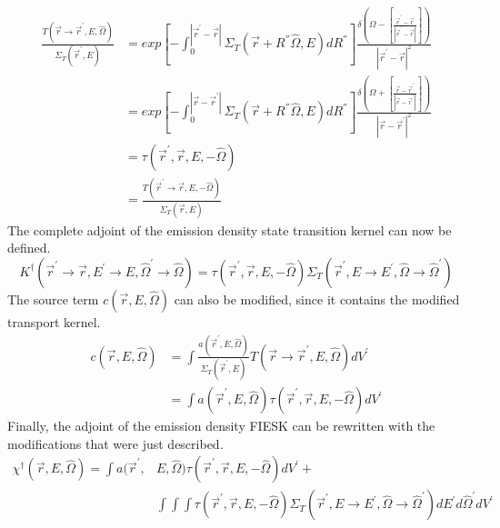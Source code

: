 \begin{align}
  \frac{T(\vec{r} \to \vec{r}^{'},E,\hat{\Omega})}{\Sigma_T(\vec{r}^{'},E)} & =
  exp\left[-\int_0^{|\vec{r}^{'} - \vec{r}|} 
    \Sigma_T \left(\vec{r} + R^{''}\hat{\Omega},E \right) dR^{''} 
    \right] \frac{\delta \left(\Omega - \left[\frac{\vec{r}^{'} - \vec{r}}
      {|\vec{r}^{'} - \vec{r}|}\right]\right)}
       {|\vec{r}^{'} - \vec{r}|^2} \nonumber \\
       & = exp\left[-\int_0^{|\vec{r} - \vec{r}^{'}|} 
    \Sigma_T \left(\vec{r} + R^{''}\hat{\Omega},E \right) dR^{''} 
    \right] \frac{\delta \left(\Omega + \left[\frac{\vec{r} - \vec{r}^{'}}
      {|\vec{r} - \vec{r}^{'}|}\right]\right)}
       {|\vec{r} - \vec{r}^{'}|^2} \nonumber \\
       & = \tau(\vec{r}^{'},\vec{r},E,-\hat{\Omega}) \\
       & = \frac{T(\vec{r}^{'} \to \vec{r},E,-\hat{\Omega})}
       {\Sigma_T(\vec{r},E)}
\end{align}
The complete adjoint of the emission density state transition kernel can now be 
defined.
\begin{equation}
  K^{\dagger}(\vec{r}^{'} \to \vec{r},E^{'} \to E,
  \hat{\Omega}^{'} \to \hat{\Omega}) = 
  \tau(\vec{r}^{'},\vec{r},E,-\hat{\Omega}) 
  \Sigma_T(\vec{r}^{'},E \to E^{'},\hat{\Omega} \to \hat{\Omega}^{'})
\end{equation}
The source term $c(\vec{r},E,\hat{\Omega})$ can also be modified, since it
contains the modified transport kernel.
\begin{align}
  c(\vec{r},E,\hat{\Omega}) & = \int \frac{a(\vec{r}^{'},E,\hat{\Omega})}
  {\Sigma_T(\vec{r}^{'},E)}T(\vec{r} \to \vec{r}^{'},E,\hat{\Omega}) dV^{'} 
  \nonumber \\
  & = \int a(\vec{r}^{'},E,\hat{\Omega}) 
  \tau(\vec{r}^{'},\vec{r},E,-\hat{\Omega}) dV^{'}
\end{align}
Finally, the adjoint of the emission density FIESK can be rewritten with the 
modifications that were just described.
\begin{equation}
  \begin{split}
    \chi^{\dagger}(\vec{r},E,\hat{\Omega}) =  \int a(\vec{r}^{'},&E,\hat{\Omega}) 
    \tau(\vec{r}^{'},\vec{r},E,-\hat{\Omega}) dV^{'} + \\
    & \int\int\int  \tau(\vec{r}^{'},\vec{r},E,-\hat{\Omega}) 
    \Sigma_T(\vec{r}^{'},E \to E^{'},\hat{\Omega} \to \hat{\Omega}^{'})
    dE^{'}d\hat{\Omega}^{'}dV^{'}
  \end{split}
  \label{eq:adjoint_of_emission_density_integral_eqn_2}
\end{equation}
 
